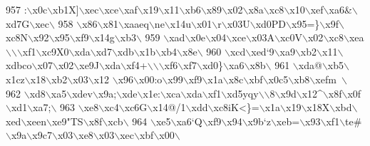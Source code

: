 \begin{DoxyCode}
957 \textcolor{stringliteral}{:\(\backslash\)x0c\(\backslash\)xb1X]\(\backslash\)xec\(\backslash\)xce\(\backslash\)xaf\(\backslash\)x19\(\backslash\)x11\(\backslash\)xb6\(\backslash\)x89\(\backslash\)x02\(\backslash\)x8a\(\backslash\)xc8\(\backslash\)x10\(\backslash\)xef\(\backslash\)xa6&\(\backslash\)xd7G\(\backslash\)xec\(\backslash\)}
958 \textcolor{stringliteral}{\(\backslash\)x86\(\backslash\)x81\(\backslash\)xaaeq\(\backslash\)ne\(\backslash\)x14u\(\backslash\)x01\(\backslash\)r\(\backslash\)x03U\(\backslash\)xd0PD\(\backslash\)x95=\}\(\backslash\)x9f\(\backslash\)xc8N\(\backslash\)x92\(\backslash\)x95\(\backslash\)xf9\(\backslash\)x14g\(\backslash\)xb3\(\backslash\)}
959 \textcolor{stringliteral}{\(\backslash\)xad\(\backslash\)x0e\(\backslash\)x04\(\backslash\)xce\(\backslash\)x03A\(\backslash\)xc0V\(\backslash\)x02\(\backslash\)xc8\(\backslash\)xea\(\backslash\)\(\backslash\)\(\backslash\)xf1\(\backslash\)xc9X0\(\backslash\)xda\(\backslash\)xd7\(\backslash\)xdb\(\backslash\)x1b\(\backslash\)xb4\(\backslash\)x8e\(\backslash\)}
960 \textcolor{stringliteral}{\(\backslash\)xcd\(\backslash\)xed`9\(\backslash\)xa9\(\backslash\)xb2\(\backslash\)x11\(\backslash\)xdbco\(\backslash\)x07\(\backslash\)x02\(\backslash\)xe9J\(\backslash\)xda\(\backslash\)xf4+\(\backslash\)\(\backslash\)\(\backslash\)xf6\(\backslash\)xf7\(\backslash\)xd0\}\(\backslash\)xa6\(\backslash\)x8b\(\backslash\)}
961 \textcolor{stringliteral}{\(\backslash\)xda@\(\backslash\)xb5\(\backslash\)x1cz\(\backslash\)x18\(\backslash\)xb2\(\backslash\)x03\(\backslash\)x12 \(\backslash\)x96\(\backslash\)x00:o\(\backslash\)x99\(\backslash\)xf9\(\backslash\)x1a\(\backslash\)x8c\(\backslash\)xbf\(\backslash\)x0c5\(\backslash\)xb8\(\backslash\)xefm~\(\backslash\)}
962 \textcolor{stringliteral}{\(\backslash\)xd8\(\backslash\)xa5\(\backslash\)xdev\(\backslash\)x9a;\(\backslash\)xde\(\backslash\)x1e:\(\backslash\)xca\(\backslash\)xda\(\backslash\)xf1\(\backslash\)xd5yqy\(\backslash\)\(\backslash\)8\(\backslash\)x9d\(\backslash\)x12^\(\backslash\)x8f\(\backslash\)x0f\(\backslash\)xd1\(\backslash\)xa7;\(\backslash\)}
963 \textcolor{stringliteral}{\(\backslash\)xe8\(\backslash\)xc4\(\backslash\)xc6G\(\backslash\)x14@/1\(\backslash\)xdd\(\backslash\)xc8iK<\}=\(\backslash\)x1a\(\backslash\)x19\(\backslash\)x18X\(\backslash\)xbd\(\backslash\)xed\(\backslash\)xeen\(\backslash\)xe9"TS\(\backslash\)x8f\(\backslash\)xcb\(\backslash\)}
964 \textcolor{stringliteral}{\(\backslash\)xe5\(\backslash\)xa6`Q\(\backslash\)xf9\(\backslash\)x94\(\backslash\)x9b`z\(\backslash\)xeb=\(\backslash\)x93\(\backslash\)xf1\(\backslash\)te#\(\backslash\)x9a\(\backslash\)x9c7\(\backslash\)x03\(\backslash\)xe8\(\backslash\)x03\(\backslash\)xec\(\backslash\)xbf\(\backslash\)x00\(\backslash\)}

\end{DoxyCode}
